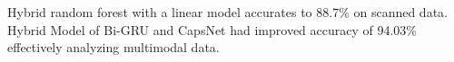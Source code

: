 Hybrid random forest with a linear model accurates to 88.7\% on scanned data. Hybrid Model of Bi-GRU and CapsNet had improved accuracy of 94.03\% effectively analyzing multimodal data.